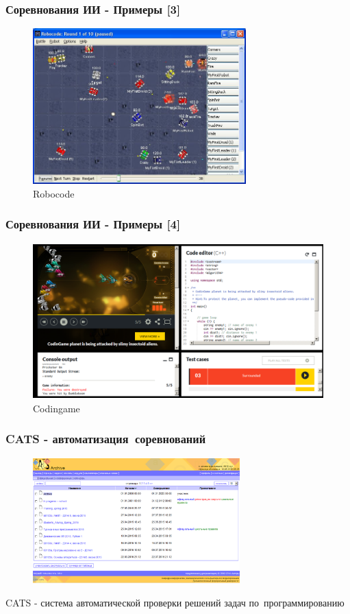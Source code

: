 \documentclass{beamer}
\begin{document}
\begin{frame}
  \frametitle{Соревнования ИИ - Примеры [3]}
  \begin{figure}[htb]
  \centering
  \includegraphics[height=6cm,keepaspectratio]{./img/robocode.jpg}
  \caption{Robocode}
  \end{figure}
\end{frame}

\begin{frame}
  \frametitle{Соревнования ИИ - Примеры [4]}
  \begin{figure}[htb]
  \centering
  \includegraphics[height=6cm,keepaspectratio]{./img/codingame.png}
  \caption{Codingame}
  \end{figure}
\end{frame}

\begin{frame}
  \frametitle{CATS - автоматизация~соревнований}
  \begin{figure}[htb]
  \centering
  \includegraphics[width=8cm,keepaspectratio]{./img/cats_screenshot.png}
  \end{figure}
  CATS - система автоматической проверки решений задач по~программированию
\end{frame}
\end{document}
